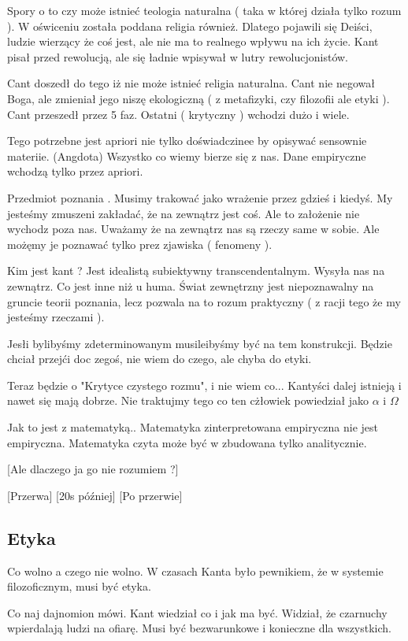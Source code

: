 \documentclass[11pt]{article}
\begin{document}
Spory o to czy może istnieć teologia naturalna ( taka w której działa tylko rozum ). W oświceniu została poddana religia również. Dlatego pojawili się Deiści, ludzie wierzący że coś jest, ale nie ma to realnego wpływu na ich życie. Kant pisał przed rewolucją, ale się ładnie wpisywał w lutry rewolucjonistów.

Cant doszedł do tego iż nie może istnieć religia naturalna. Cant nie negował Boga, ale zmieniał jego niszę ekologiczną ( z metafizyki, czy filozofii ale etyki ). Cant przeszedł przez 5 faz. Ostatni ( krytyczny ) wchodzi dużo i wiele.

Tego potrzebne jest apriori nie tylko doświadczinee by opisywać sensownie materiie. (Angdota)  Wszystko co wiemy bierze się z nas. Dane empiryczne wchodzą tylko przez apriori. 

Przedmiot poznania . Musimy trakować jako wrażenie przez gdzieś i kiedyś. My jesteśmy zmuszeni zakładać, że na zewnątrz jest coś. Ale to założenie nie wychodz poza nas.
Uważamy że na zewnątrz nas są rzeczy same w sobie. Ale możęmy je poznawać tylko prez zjawiska ( fenomeny ). 

Kim jest kant ? Jest idealistą subiektywny transcendentalnym. Wysyła nas na zewnątrz. Co jest inne niż u huma. Świat zewnętrzny jest niepoznawalny na gruncie teorii poznania, lecz pozwala na to rozum praktyczny ( z racji tego że my jesteśmy rzeczami ).

Jesłi bylibyśmy zdeterminowanym musileibyśmy być na tem konstrukcji. Będzie chciał przejći doc zegoś, nie wiem do czego, ale chyba do etyki.

Teraz będzie o "Krytyce czystego rozmu", i nie wiem co...
Kantyści dalej istnieją i nawet się mają dobrze. Nie traktujmy tego co ten cżłowiek powiedział jako $\alpha$ i $\Omega$

Jak to jest z matematyką.. Matematyka zinterpretowana empiryczna nie jest empiryczna. Matematyka czyta może być w zbudowana tylko analitycznie. 

[Ale dlaczego ja go nie rozumiem ?] 

[Przerwa]
[20s później]
[Po przerwie]

\subsection{Etyka}
Co wolno a czego nie wolno. W czasach Kanta było pewnikiem, że w systemie filozoficznym, musi być etyka.

Co naj dajnomion mówi. Kant wiedział co i jak ma być. Widział, że czarnuchy wpierdalają ludzi na ofiarę. Musi być bezwarunkowe i konieczne dla wszystkich.
\end{document}
